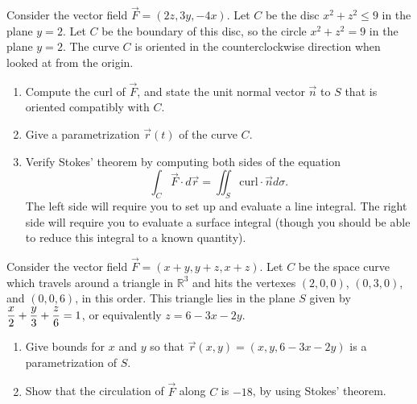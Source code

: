 \begin{problem}
 Consider the vector field $\vec F = (2z,3y,-4x)$. Let $C$ be the disc $x^2+z^2\leq 9$ in the plane $y=2$.  Let $C$ be the boundary of this disc, so the circle $x^2+z^2=9$ in the plane $y=2$.  The curve $C$ is oriented in the counterclockwise direction when looked at from the origin.
\begin{enumerate}
 \item Compute the curl of $\vec F$, and state the unit normal vector $\vec n$ to $S$ that is oriented compatibly with $C$.
 \item Give a parametrization $\vec r(t)$ of the curve $C$. 
 \item Verify Stokes' theorem by computing both sides of the equation $$\int_C\vec F\cdot d\vec r = \iint_S \text{curl}\cdot \vec n d\sigma.$$
 The left side will require you to set up and evaluate a line integral.  The right side will require you to evaluate a surface integral (though you should be able to reduce this integral to a known quantity).
\end{enumerate}
  
\end{problem}


\begin{problem}
Consider the vector field $\vec F = \left(x+y, y+z, x+z\right)$. 
Let $C$ be the space curve which travels around a triangle in $\mathbb{R}^3$ and hits the vertexes $(2,0,0)$, $(0,3,0)$, and $(0,0,6)$, in this order. 
This triangle lies in the plane $S$ given by $\displaystyle \frac x2+\frac y3 +\frac z6=1$, or equivalently $z=6-3x-2y$. 
\begin{enumerate}
 \item Give bounds for $x$ and $y$ so that $\vec r(x,y)=(x,y,6-3x-2y)$ is a parametrization of $S$.
 \item Show that the circulation of $\vec F$ along $C$ is $-18$, by using Stokes' theorem.
\end{enumerate}
\end{problem}


